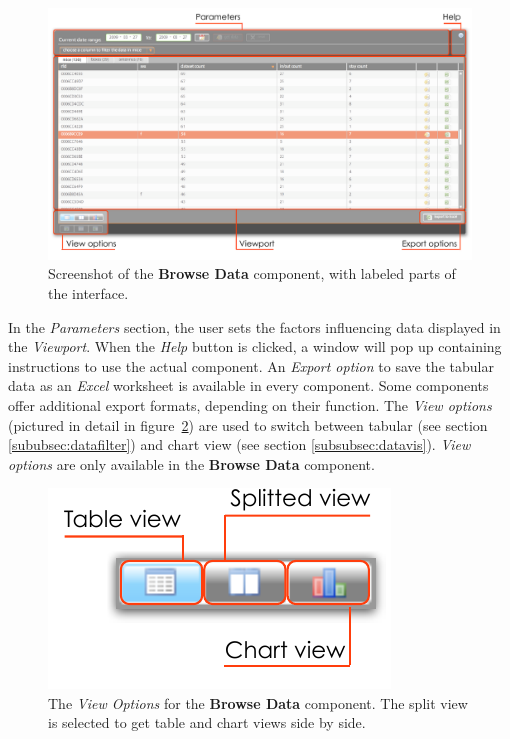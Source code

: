 \begin{figure}[!htbp]
\begin{center}
  \includegraphics[width=\textwidth]{assets/pdf/interface_component.pdf}
  \caption[\textit{Browse Data} component interface]{Screenshot of the \textbf{Browse Data} component, with labeled parts of the interface.}
  \label{fig:interface_component}
\end{center}
\end{figure}

In the \textit{Parameters} section, the user sets the factors influencing data displayed in the \textit{Viewport}. When the \textit{Help} button is clicked, a window will pop up containing instructions to use the actual component. An \textit{Export option} to save the tabular data as an \textit{Excel} worksheet is available in every component. Some components offer additional export formats, depending on their function. The \textit{View options} (pictured in detail in figure~\ref{fig:view_options}) are used to switch between tabular (see section \ref{sububsec:datafilter}) and chart view (see section \ref{subsubsec:datavis}). \textit{View options} are only available in the \textbf{Browse Data} component.

\begin{figure}[htpb]
\begin{center}
\includegraphics[width=.3\textwidth]{assets/pdf/view_options.pdf}
\caption[View options]{The \textit{View Options} for the \textbf{Browse Data} component. The split view is selected to get table and chart views side by side.}
\label{fig:view_options}
\end{center}
\end{figure}    

